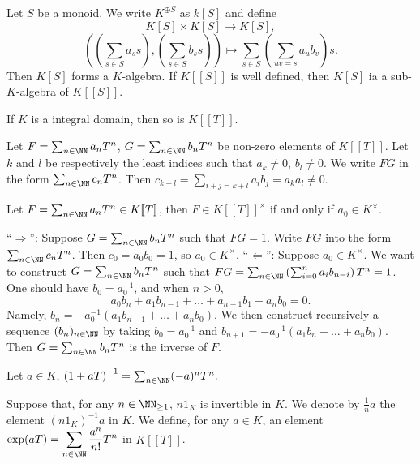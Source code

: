 \begin{exampleenv}
    Let $S$ be a monoid. We write $K^{\oplus S}$ as $k[S]$ and define 
    $$K[S]\times K[S]\longrightarrow K[S],$$
    $$\left(\left(\sum_{s\in S}a_s s\right),\left(\sum_{s\in S}b_s s\right)\right)\longmapsto \sum_{s\in S}\left(\sum_{uv=s}a_ub_v\right)s.$$
    Then $K[S]$ forms a $K$-algebra. If $K[\![S]\!]$ is well defined, then $K[S]$ ia a sub-$K$-algebra of $K[\![S]\!]$.
\end{exampleenv}
\begin{propositionenv}
    If $K$ is a integral domain, then so is $K[\![T]\!]$.
\end{propositionenv}
\begin{proofenv}
    Let $F=\sum_{n\in \NN}a_nT^n$, $G=\sum_{n\in \NN}b_nT^n$ be non-zero elements of $K[\![T]\!]$. Let $k$ and $l$ be respectively the least indices such that $a_k\not=0$, $b_l\not=0$. We write $FG$ in the form $\sum_{n\in \NN}c_nT^n$. Then $c_{k+l}=\sum_{i+j=k+l}a_ib_j=a_ka_l\not=0.$
\end{proofenv}
\begin{propositionenv}
    Let $F=\sum_{n\in \NN}a_nT^n\in K[\![T]\!]$, then $F\in K[\![T]\!]^\times$ if and only if $a_0\in K^\times$.
\end{propositionenv}
\begin{proofenv}
    ``$\Rightarrow$'': Suppose $G=\sum_{n\in\NN}b_nT^n$ such that $FG=1$. Write $FG$ into the form $\sum_{n\in \NN}c_nT^n$. Then $c_0=a_0b_0=1$, so $a_0\in K^\times$.
    \newline
    ``$\Leftarrow$'': Suppose $a_0\in K^\times$. We want to construct $G=\sum_{n\in\NN}b_nT^n$ such that $FG=\sum_{n\in\NN}\left(\sum_{i=0}^{n}a_ib_{n-i}\right)T^n=1$. One should have $b_0=a_0^{-1}$, and when $n>0$, 
    $$a_0b_n+a_1b_{n-1}+\dots+a_{n-1}b_1+a_nb_0=0.$$
    Namely, $b_n=-a_0^{-1}\left(a_1b_{n-1}+\dots+a_nb_0\right)$. We then construct recursively a sequence $(b_n)_{n\in\NN}$ by taking $b_0=a_0^{-1}$ and $b_{n+1}=-a_0^{-1}\left(a_1b_n+\dots+a_nb_0\right)$. Then $G=\sum_{n\in\NN}b_nT^n$ is the inverse of $F$.
\end{proofenv}
\begin{exampleenv}
    Let $a\in K$, $\left(1+aT\right)^{-1}=\sum_{n\in\NN}(-a)^nT^n.$
\end{exampleenv}
\begin{definitionenv}
    Suppose that, for any $n\in \NN_{\ge 1}$, $n1_K$ is invertible in $K$. We denote by $\frac{1}{n} a$ the element $\left(n1_K\right)^{-1}a$ in $K$. We define, for any $a\in K$, an element $\displaystyle\exp(aT)=\sum_{n\in\NN}\frac{a^n}{n!}T^n$ in $K[\![T]\!]$.
\end{definitionenv}
